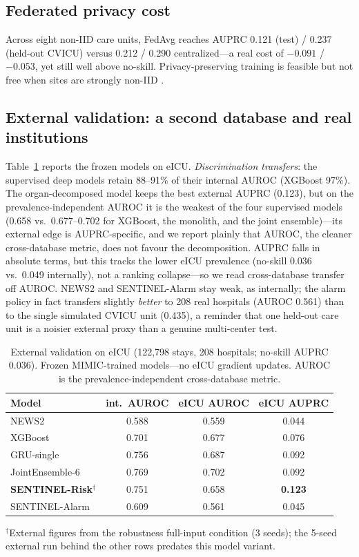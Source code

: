 \documentclass[conference]{IEEEtran}
\begin{document}
\subsection{Federated privacy cost}
Across eight non-IID care units, FedAvg reaches AUPRC 0.121 (test) / 0.237 (held-out
CVICU) versus 0.212 / 0.290 centralized---a real cost of $-0.091$ / $-0.053$, yet still well
above no-skill. Privacy-preserving training is feasible but not free when sites are
strongly non-IID \cite{zhao2018noniid}.

\subsection{External validation: a second database and real institutions}
\label{subsec:external}
Table~\ref{tab:eicu} reports the frozen models on eICU. \emph{Discrimination
transfers}: the supervised deep models retain 88--91\% of their internal AUROC
(XGBoost 97\%). The organ-decomposed model keeps the best external AUPRC (0.123), but
on the prevalence-independent AUROC it is the weakest of the four supervised models
(0.658 vs.\ 0.677--0.702 for XGBoost, the monolith, and the joint ensemble)---its
external edge is AUPRC-specific, and we report plainly that AUROC, the cleaner
cross-database metric, does not favour the decomposition. AUPRC falls in
absolute terms, but this tracks the lower eICU prevalence (no-skill 0.036 vs.\ 0.049
internally), not a ranking collapse---so we read cross-database transfer off AUROC.
NEWS2 and SENTINEL-Alarm stay weak, as internally; the alarm policy in fact
transfers slightly \emph{better} to 208 real hospitals (AUROC 0.561) than to the single
simulated CVICU unit (0.435), a reminder that one held-out care unit is a noisier
external proxy than a genuine multi-center test.

\begin{table}[t]
\caption{External validation on eICU (122{,}798 stays, 208 hospitals; no-skill AUPRC
0.036). Frozen MIMIC-trained models---no eICU gradient updates. AUROC is the
prevalence-independent cross-database metric.}
\label{tab:eicu}
\centering\small\setlength{\tabcolsep}{3pt}
\begin{tabular}{lccc}
\toprule
Model & int.\ AUROC & eICU AUROC & eICU AUPRC \\
\midrule
NEWS2 & 0.588 & 0.559 & 0.044 \\
XGBoost & 0.701 & 0.677 & 0.076 \\
GRU-single & 0.756 & 0.687 & 0.092 \\
JointEnsemble-6 & 0.769 & 0.702 & 0.092 \\
\textbf{SENTINEL-Risk}$^{\dagger}$ & 0.751 & 0.658 & \textbf{0.123} \\
SENTINEL-Alarm & 0.609 & 0.561 & 0.045 \\
\bottomrule
\end{tabular}

{\footnotesize $^{\dagger}$External figures from the robustness full-input condition
(3 seeds); the 5-seed external run behind the other rows predates this model variant.}
\end{table}
\end{document}
